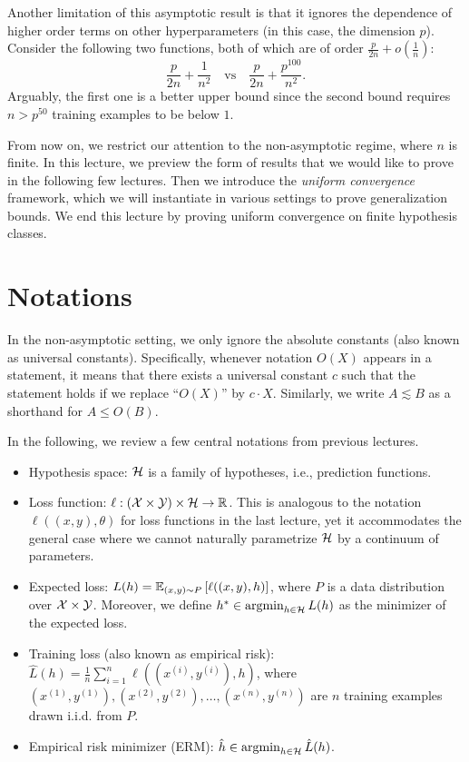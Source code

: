 \documentclass[11pt]{article}
\begin{document}
Another limitation of this asymptotic result is that it ignores the dependence of higher order terms on other hyperparameters (in this case, the dimension $p$). Consider the following two functions, both of which are of order $\frac{p}{2n} + o\left(\frac{1}{n}\right)$:
	\[\frac{p}{2n} + \frac{1}{n^2} \quad \textrm{vs} \quad \frac{p}{2n} + \frac{p^{100}}{n^2}.\]
Arguably, the first one is a better upper bound since the second bound requires $n > p^{50}$ training examples to be below $1$.

From now on, we restrict our attention to the non-asymptotic regime, where $n$ is finite. In this lecture, we preview the form of results that we would like to prove in the following few lectures. Then we introduce the \emph{uniform convergence} framework, which we will instantiate in various settings to prove generalization bounds. We end this lecture by proving uniform convergence on finite hypothesis classes.

\section{Notations}
In the non-asymptotic setting, we only ignore the absolute constants (also known as universal constants). Specifically, whenever notation $O(X)$ appears in a statement, it means that there exists a universal constant $c$ such that the statement holds if we replace ``$O(X)$'' by $c\cdot X$. Similarly, we write $A \lesssim B$ as a shorthand for $A \le O(B)$.

In the following, we review a few central notations from previous lectures.
\begin{itemize}
	\item Hypothesis space: $\mathcal{H}$ is a family of hypotheses, i.e., prediction functions.
	\item Loss function: $\ell: (\mathcal{X} \times \mathcal{Y}) \times \mathcal{H} \to \mathbb{R}$. This is analogous to the notation $\ell((x, y), \theta)$ for loss functions in the last lecture, yet it accommodates the general case where we cannot naturally parametrize $\mathcal{H}$ by a continuum of parameters.
	\item Expected loss: $L(h) = \mathbb{E}_{(x, y)\sim P}\left[\ell((x, y), h)\right]$, where $P$ is a data distribution over $\mathcal{X} \times \mathcal{Y}$. Moreover, we define $h^* \in \operatorname*{argmin}_{h \in \mathcal{H}}L(h)$ as the minimizer of the expected loss.
	\item Training loss (also known as empirical risk): $\hat L(h) = \frac{1}{n}\sum_{i=1}^{n}\ell\left(\left(x^{(i)}, y^{(i)}\right), h\right)$, where
		$\left(x^{(1)}, y^{(1)}\right), \left(x^{(2)}, y^{(2)}\right), \ldots, \left(x^{(n)}, y^{(n)}\right)$
	are $n$ training examples drawn i.i.d. from $P$.
	\item Empirical risk minimizer (ERM): $\hat h \in \operatorname*{argmin}_{h\in\mathcal{H}}\hat L(h)$.
\end{itemize}
\end{document}
